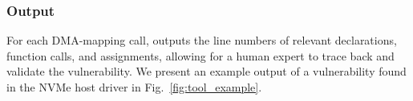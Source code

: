 
\subsubsection{Output}
%
For each DMA-mapping call, \tool outputs the line numbers of relevant declarations, function calls, and assignments, allowing for a human expert to trace back and validate the vulnerability. We present an example output of a vulnerability found in the NVMe host driver in Fig.~\ref{fig:tool_example}.

